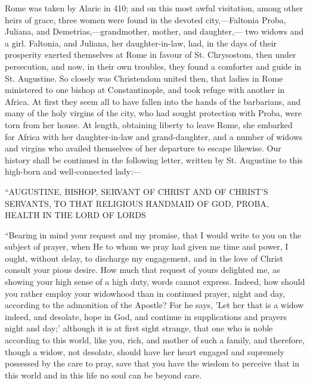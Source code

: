 Rome was taken by Alaric in 410; and on this most awful visitation,
among other heirs of grace, three women were found in the devoted
city,—Faltonia Proba, Juliana, and Demetrias,—grandmother, mother,
and daughter,— two widows and a girl. Faltonia, and Juliana,
her daughter-in-law, had, in the days of their prosperity exerted
themselves at Rome in favour of St. Chrysostom, then under
persecution, and now, in their own troubles, they found a comforter
and guide in St. Augustine. So closely was Christendom united then,
that ladies in Rome ministered to one bishop at Constantinople, and
took refuge with another in Africa. At first they seem all to have
fallen into the hands of the barbarians, and many of the holy virgins
of the city, who had sought protection with Proba, were torn from her
house. At length, obtaining liberty to leave Rome, she embarked for
Africa with her daughter-in-law and grand-daughter, and a number of
widows and virgins who availed themselves of her departure to escape
likewise. Our history shall be continued in the following letter,
written by St. Augustine to this high-born and well-connected lady:—

``AUGUSTINE, BISHOP, SERVANT OF CHRIST AND OF CHRIST'S
SERVANTS, TO THAT RELIGIOUS HANDMAID OF GOD, PROBA, HEALTH IN THE LORD
OF LORDS

``Bearing in mind your request and my promise, that I would
write to you on the subject of prayer, when He to whom we pray had
given me time and power, I ought, without delay, to discharge my
engagement, and in the love of Christ consult your pious desire. How
much that request of yours delighted me, as showing your high sense of
a high duty, words cannot express. Indeed, how should you rather
employ your widowhood than in continued prayer, night and day,
according to the admonition of the Apostle? For he says, 'Let her that
is a widow indeed, and desolate, hope in God, and continue in
supplications and prayers night and day;' although it is at first
sight strange, that one who is noble according to this world, like
you, rich, and mother of such a family, and therefore, though a widow,
not desolate, should have her heart engaged and supremely possessed by
the care to pray, save that you have the wisdom to perceive that in
this world and in this life no soul can be beyond care.


